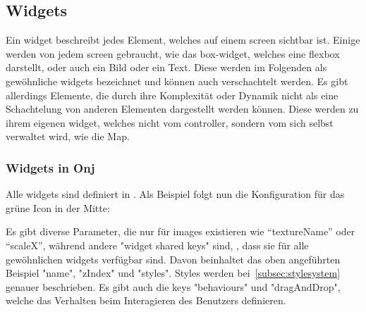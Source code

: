 
\renewcommand{\kapitelautor}{Autor: Felix Zwickelstorfer}
\subsection{Widgets}\label{sec:widgets}
\renewcommand{\kapitelautor}{Autor: Felix Zwickelstorfer}
Ein widget beschreibt jedes Element, welches auf einem screen sichtbar ist. 
Einige werden von jedem screen gebraucht, wie \zB das box-widget, welches eine flexbox darstellt, oder auch ein Bild oder ein Text.
Diese werden im Folgenden als gewöhnliche widgets bezeichnet und können auch verschachtelt werden.
Es gibt allerdings Elemente, die durch ihre Komplexität oder Dynamik nicht als eine Schachtelung von anderen Elementen dargestellt werden können. 
Diese werden zu ihrem eigenen widget, welches nicht vom controller, sondern vom sich selbst verwaltet wird, wie \zB die Map.
\renewcommand{\kapitelautor}{Autor: Felix Zwickelstorfer}
\subsubsection{Widgets in Onj}\label{subsubsec:widgetsinonj}
\renewcommand{\kapitelautor}{Autor: Felix Zwickelstorfer}

Alle widgets sind definiert in .
Als Beispiel folgt nun die Konfiguration für das grüne Icon in der Mitte:
Es gibt diverse Parameter, die nur für images existieren wie \zB ``textureName'' oder ``scaleX'', während andere "widget shared keys" sind, \dah, dass sie für alle gewöhnlichen widgets verfügbar sind.
Davon beinhaltet das oben angeführten Beispiel "name", "zIndex" und "styles".
Styles werden bei~\ref{subsec:stylesystem} genauer beschrieben.
Es gibt auch die keys "behaviours" und "dragAndDrop", welche das Verhalten beim Interagieren des Benutzers definieren.

